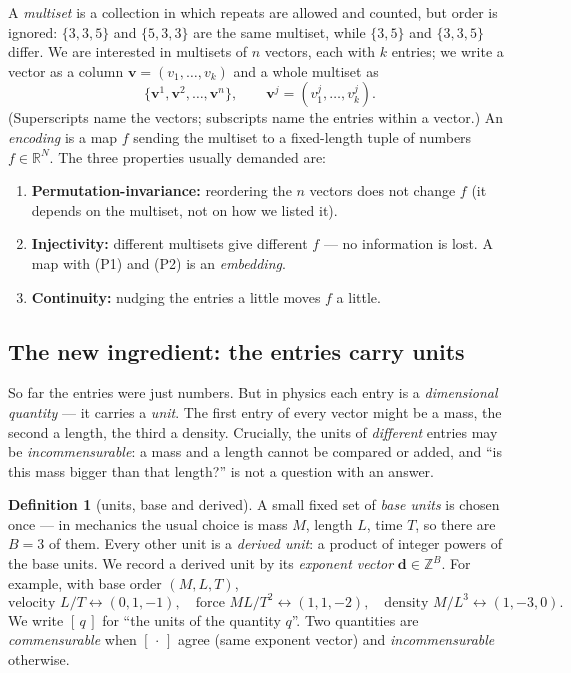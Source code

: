 \documentclass[11pt,a4paper]{article}
\theoremstyle{definition}
\newtheorem{definition}{Definition}[section]
\theoremstyle{plain}
\newcommand{\R}{\mathbb{R}}
\newcommand{\Z}{\mathbb{Z}}
\newcommand{\bvec}[1]{\mathbf{#1}}
\newcommand{\units}[1]{[\,#1\,]}   %
\begin{document}
A \emph{multiset} is a collection in which repeats are allowed and counted, but
order is ignored: $\{3,3,5\}$ and $\{5,3,3\}$ are the same multiset, while
$\{3,5\}$ and $\{3,3,5\}$ differ. We are interested in multisets of $n$ vectors,
each with $k$ entries; we write a vector as a column $\bvec v=(v_1,\dots,v_k)$ and
a whole multiset as
\[
   \{\bvec v^1,\bvec v^2,\dots,\bvec v^n\},
   \qquad \bvec v^j=(v^j_1,\dots,v^j_k).
\]
(Superscripts name the vectors; subscripts name the entries within a vector.) An
\emph{encoding} is a map $f$ sending the multiset to a fixed-length tuple of
numbers $f\in\R^N$. The three properties usually demanded are:
\begin{enumerate}[label=\textbf{(P\arabic*)},leftmargin=*]
\item \textbf{Permutation-invariance:} reordering the $n$ vectors does not change
      $f$ (it depends on the multiset, not on how we listed it).
\item \textbf{Injectivity:} different multisets give different $f$ --- no
      information is lost. A map with (P1) and (P2) is an \emph{embedding}.
\item \textbf{Continuity:} nudging the entries a little moves $f$ a little.
\end{enumerate}

\subsection{The new ingredient: the entries carry units}

So far the entries were just numbers. But in physics each entry is a
\emph{dimensional quantity} --- it carries a \emph{unit}. The first entry of every
vector might be a mass, the second a length, the third a density. Crucially, the
units of \emph{different} entries may be \emph{incommensurable}: a mass and a
length cannot be compared or added, and ``is this mass bigger than that length?''
is not a question with an answer.

\begin{definition}[units, base and derived]\label{def:units}
A small fixed set of \emph{base units} is chosen once --- in mechanics the usual
choice is mass $M$, length $L$, time $T$, so there are $B=3$ of them. Every other
unit is a \emph{derived unit}: a product of integer powers of the base units. We
record a derived unit by its \emph{exponent vector} $\bvec d\in\Z^{B}$. For
example, with base order $(M,L,T)$,
\[
   \text{velocity }L/T \leftrightarrow (0,1,-1),\quad
   \text{force }ML/T^2 \leftrightarrow (1,1,-2),\quad
   \text{density }M/L^3\leftrightarrow(1,-3,0).
\]
We write $\units{q}$ for ``the units of the quantity $q$''. Two quantities are
\emph{commensurable} when $\units{\cdot}$ agree (same exponent vector) and
\emph{incommensurable} otherwise.
\end{definition}
\end{document}
